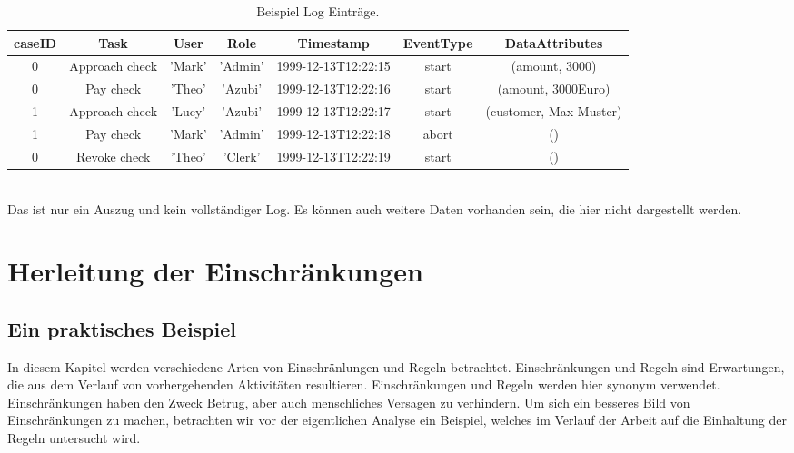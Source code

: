 \begin{table}[h!]
\footnotesize
  \centering
  \begin{tabular}{|c|c|c|c|c|c|c|}
  \hline
  caseID & Task & User & Role & Timestamp & EventType & DataAttributes\\
  \hline
  0 & Approach check &'Mark' &'Admin' &1999-12-13T12:22:15 & start&(amount, 3000)\\
  0 & Pay check & 'Theo' &'Azubi' &1999-12-13T12:22:16 & start&(amount, 3000Euro)\\
  1 & Approach check &'Lucy' & 'Azubi' &1999-12-13T12:22:17 &start&(customer, Max Muster)\\
  1 & Pay check &'Mark' & 'Admin' &1999-12-13T12:22:18 & abort&()\\
  0 & Revoke check & 'Theo' & 'Clerk' & 1999-12-13T12:22:19 & start&()\\
  \hline
  \end{tabular}
\\
Das ist nur ein Auszug und kein vollständiger Log. Es können auch weitere Daten vorhanden sein, die hier nicht dargestellt werden.
  \caption{Beispiel Log Einträge. }
  \label{tab:examplelog}
\end{table}

\section{Herleitung der Einschränkungen}



\subsection{Ein praktisches Beispiel}
\label{sec:exampleconstraints}

In diesem Kapitel werden verschiedene Arten von Einschränlungen und Regeln betrachtet.
Einschränkungen und Regeln sind Erwartungen, die aus dem Verlauf von vorhergehenden Aktivitäten resultieren. Einschränkungen und Regeln werden hier synonym verwendet.
Einschränkungen haben den Zweck Betrug, aber auch menschliches Versagen zu verhindern.
Um sich ein besseres Bild von Einschränkungen zu machen, betrachten wir vor der eigentlichen Analyse ein Beispiel, welches im Verlauf der Arbeit auf die Einhaltung der Regeln untersucht wird.

